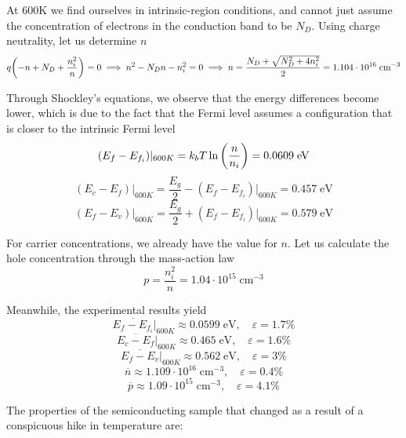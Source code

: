 \documentclass{book}
\begin{document}
            At 600K we find ourselves in intrinsic-region conditions, and cannot just assume the concentration of electrons in the conduction band to be $N_{D}$.
            Using charge neutrality, let us determine $n$
            \[
                q \qty( -n + N_{D} + \frac{n_{i}^{2}}{n} ) = 0 \implies n^{2} - N_{D}n - n_{i}^{2} = 0 \implies n = \frac{N_{D} + \sqrt{N_{D}^{2} + 4 n_{i}^{2}}}{2} = 1.104 \cdot 10^{16} \; \text{cm}^{-3}
            \]

            Through Shockley's equations, we observe that the energy differences become lower, which is due to the fact that the Fermi level assumes a configuration that is closer to the intrinsic Fermi level
            \[
                (E_{f} - E_{f_i})\vert_{600K} = k_{b} T \ln\qty(\frac{n}{n_{i}}) = 0.0609 \; \text{eV}
            \]
            \[
                (E_{c} - E_{f})\vert_{600K} = \frac{E_{g}}{2} - (E_{f} - E_{f_i})\vert_{600K} = 0.457 \; \text{eV}
            \]
            \[
                (E_{f} - E_{v})\vert_{600K} = \frac{E_{g}}{2} + (E_{f} - {E_{f_i}})\vert_{600K} = 0.579 \; \text{eV}
            \]

            For carrier concentrations, we already have the value for $n$. Let us calculate the hole concentration through the mass-action law
            \[
                p = \frac{n_{i}^{2}}{n} = 1.04 \cdot 10^{15} \; \text{cm}^{-3}
            \]

            Meanwhile, the experimental results yield
            \[
                \overline{E_{f} - E_{f_i}}\vert_{600K} \approx 0.0599\; \text{eV}, \quad \varepsilon = 1.7 \%
            \]
            \[
                \overline{E_{c} - E_{f}}\vert_{600K} \approx 0.465 \; \text{eV}, \quad \varepsilon = 1.6 \%
            \]
            \[
                \overline{E_{f} - E_{v}}\vert_{600K} \approx 0.562 \; \text{eV}, \quad \varepsilon = 3 \%
            \]
            \[
                \overline{n} \approx 1.109 \cdot 10^{16} \; \text{cm}^{-3}, \quad \varepsilon = 0.4 \%
            \]
            \[
                \overline{p} \approx 1.09 \cdot 10^{15} \; \text{cm}^{-3}, \quad \varepsilon = 4.1 \%
            \]

            The properties of the semiconducting sample that changed as a result of a conspicuous hike in temperature are:
\end{document}
